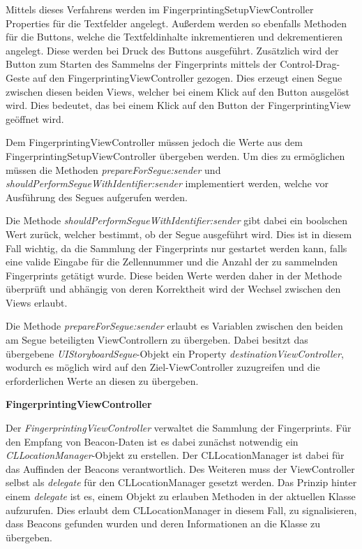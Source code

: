 Mittels dieses Verfahrens werden im FingerprintingSetupViewController Properties für die Textfelder angelegt. Außerdem werden so ebenfalls Methoden für die Buttons, welche die Textfeldinhalte inkrementieren und dekrementieren angelegt. Diese werden bei Druck des Buttons ausgeführt.
Zusätzlich wird der Button zum Starten des Sammelns der Fingerprints mittels der Control-Drag-Geste auf den FingerprintingViewController gezogen. Dies erzeugt einen Segue zwischen diesen beiden Views, welcher bei einem Klick auf den Button ausgelöst wird. Dies bedeutet, das bei einem Klick auf den Button der FingerprintingView geöffnet wird.

Dem FingerprintingViewController müssen jedoch die Werte aus dem FingerprintingSetupViewController übergeben werden. Um dies zu ermöglichen müssen die Methoden \emph{prepareForSegue:sender} und \emph{shouldPerformSegueWithIdentifier:sender} implementiert werden, welche vor Ausführung des Segues aufgerufen werden.

Die Methode \emph{shouldPerformSegueWithIdentifier:sender} gibt dabei ein boolschen Wert zurück, welcher bestimmt, ob der Segue ausgeführt wird. Dies ist in diesem Fall wichtig, da die Sammlung der Fingerprints nur gestartet werden kann, falls eine valide Eingabe für die Zellennummer und die Anzahl der zu sammelnden Fingerprints getätigt wurde.
Diese beiden Werte werden daher in der Methode überprüft und abhängig von deren Korrektheit wird der Wechsel zwischen den Views erlaubt.

Die Methode \emph{prepareForSegue:sender} erlaubt es Variablen zwischen den beiden am Segue beteiligten ViewControllern zu übergeben. Dabei besitzt das übergebene \emph{UIStoryboardSegue}-Objekt ein Property \emph{destinationViewController}, wodurch es möglich wird auf den Ziel-ViewController zuzugreifen und die erforderlichen Werte an diesen zu übergeben.


\textbf{FingerprintingViewController}


Der \emph{FingerprintingViewController} verwaltet die Sammlung der Fingerprints. 
Für den Empfang von Beacon-Daten ist es dabei zunächst notwendig ein \emph{CLLocationManager}-Objekt zu erstellen. Der CLLocationManager ist dabei für das Auffinden der Beacons verantwortlich.
Des Weiteren muss der ViewController selbst als \emph{delegate} für den CLLocationManager gesetzt werden. 
Das Prinzip hinter einem \emph{delegate} ist es, einem Objekt zu erlauben Methoden in der aktuellen Klasse aufzurufen. Dies erlaubt dem CLLocationManager in diesem Fall, zu signalisieren, dass Beacons gefunden wurden und deren Informationen an die Klasse zu übergeben.


